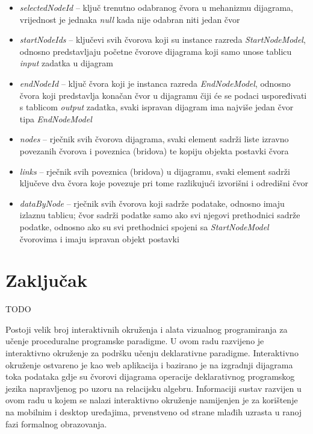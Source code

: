 \documentclass[times, utf8, diplomski, numeric]{fer}
\begin{document}
\begin{itemize}
    \item \emph{selectedNodeId} -- ključ trenutno odabranog čvora u mehanizmu dijagrama, vrijednost je jednaka \emph{null} kada nije odabran niti jedan čvor
    \item \emph{startNodeIds} -- ključevi svih čvorova koji su instance razreda \emph{StartNodeModel}, odnosno predstavljaju početne čvorove dijagrama koji samo unose tablicu \emph{input} zadatka u dijagram
    \item \emph{endNodeId} -- ključ čvora koji je instanca razreda \emph{EndNodeModel}, odnosno čvora koji predstavlja konačan čvor u dijagramu čiji će se podaci uspoređivati s tablicom \emph{output} zadatka, svaki ispravan dijagram ima najviše jedan čvor tipa \emph{EndNodeModel}
    \item \emph{nodes} -- rječnik svih čvorova dijagrama, svaki element sadrži liste izravno povezanih čvorova i poveznica (bridova) te kopiju objekta postavki čvora
    \item \emph{links} -- rječnik svih poveznica (bridova) u dijagramu, svaki element sadrži ključeve dva čvora koje povezuje pri tome razlikujući izvorišni i odredišni čvor
    \item \emph{dataByNode} -- rječnik svih čvorova koji sadrže podatake, odnosno imaju izlaznu tablicu; čvor sadrži podatke samo ako svi njegovi prethodnici sadrže podatke, odnosno ako su svi prethodnici spojeni sa \emph{StartNodeModel} čvorovima i imaju ispravan objekt postavki
\end{itemize}

\chapter{Zaključak}

TODO







\begin{sazetak}
Postoji velik broj interaktivnih okruženja i alata vizualnog programiranja za učenje proceduralne programske paradigme.
U ovom radu razvijeno je interaktivno okruženje za podršku učenju deklarativne paradigme.
Interaktivno okruženje ostvareno je kao web aplikacija i bazirano je na izgradnji dijagrama toka podataka gdje su čvorovi dijagrama operacije deklarativnog programskog jezika napravljenog po uzoru na relacijsku algebru.
Informaciji sustav razvijen u ovom radu u kojem se nalazi interaktivno okruženje namijenjen je za korištenje na mobilnim i desktop uređajima, prvenstveno od strane mlađih uzrasta u ranoj fazi formalnog obrazovanja.


\end{sazetak}
\end{document}
